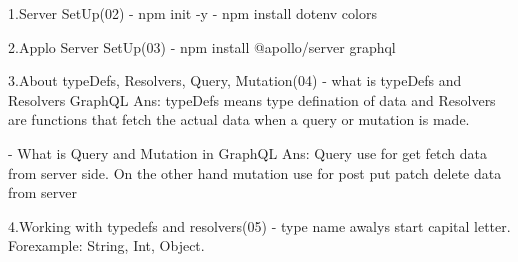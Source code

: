 1.Server SetUp(02)
 - npm init -y
 - npm install dotenv colors         

 2.Applo Server SetUp(03)
  - npm install @apollo/server graphql

3.About typeDefs, Resolvers, Query, Mutation(04)
 - what is typeDefs and Resolvers GraphQL
 Ans: typeDefs means type defination of data and Resolvers are functions that fetch the
  actual data when a query or mutation is made. 

 - What is Query and Mutation in GraphQL
 Ans: Query use for get fetch data from server side. On the other hand mutation use for post
  put patch delete data from server

4.Working with typedefs and resolvers(05)
 - type name awalys start capital letter. Forexample: String, Int, Object.
